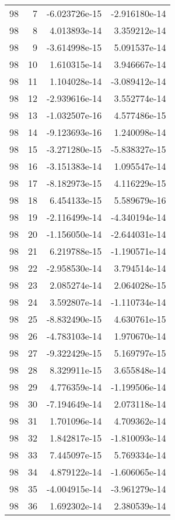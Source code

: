 \begin{tabular}{rrrr}
  98 &    7 & -6.023726e-15 & -2.916180e-14 \\
  98 &    8 &  4.013893e-14 &  3.359212e-14 \\
  98 &    9 & -3.614998e-15 &  5.091537e-14 \\
  98 &   10 &  1.610315e-14 &  3.946667e-14 \\
  98 &   11 &  1.104028e-14 & -3.089412e-14 \\
  98 &   12 & -2.939616e-14 &  3.552774e-14 \\
  98 &   13 & -1.032507e-16 &  4.577486e-15 \\
  98 &   14 & -9.123693e-16 &  1.240098e-14 \\
  98 &   15 & -3.271280e-15 & -5.838327e-15 \\
  98 &   16 & -3.151383e-14 &  1.095547e-14 \\
  98 &   17 & -8.182973e-15 &  4.116229e-15 \\
  98 &   18 &  6.454133e-15 &  5.589679e-16 \\
  98 &   19 & -2.116499e-14 & -4.340194e-14 \\
  98 &   20 & -1.156050e-14 & -2.644031e-14 \\
  98 &   21 &  6.219788e-15 & -1.190571e-14 \\
  98 &   22 & -2.958530e-14 &  3.794514e-14 \\
  98 &   23 &  2.085274e-14 &  2.064028e-15 \\
  98 &   24 &  3.592807e-14 & -1.110734e-14 \\
  98 &   25 & -8.832490e-15 &  4.630761e-15 \\
  98 &   26 & -4.783103e-14 &  1.970670e-14 \\
  98 &   27 & -9.322429e-15 &  5.169797e-15 \\
  98 &   28 &  8.329911e-15 &  3.655848e-14 \\
  98 &   29 &  4.776359e-14 & -1.199506e-14 \\
  98 &   30 & -7.194649e-14 &  2.073118e-14 \\
  98 &   31 &  1.701096e-14 &  4.709362e-14 \\
  98 &   32 &  1.842817e-15 & -1.810093e-14 \\
  98 &   33 &  7.445097e-15 &  5.769334e-14 \\
  98 &   34 &  4.879122e-14 & -1.606065e-14 \\
  98 &   35 & -4.004915e-14 & -3.961279e-14 \\
  98 &   36 &  1.692302e-14 &  2.380539e-14 \\

\end{tabular}
